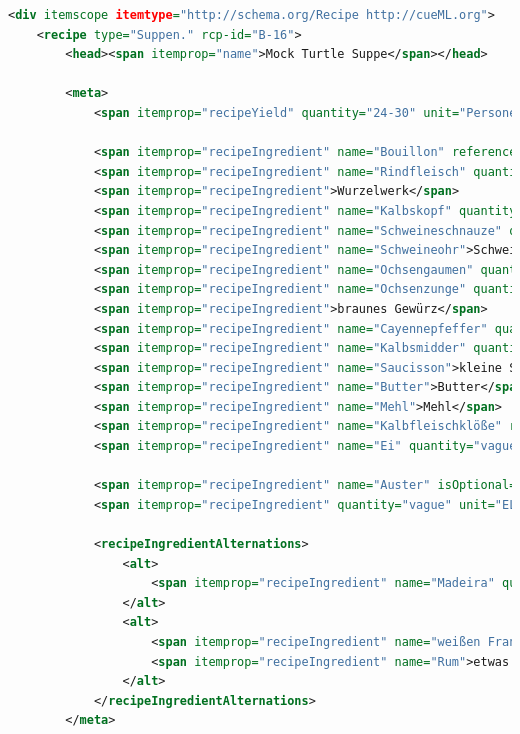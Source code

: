 \documentclass[12pt, twoside]{report}
\begin{document}
\begin{lstlisting}[language=XML, caption={Enriched with cueML}]
<div itemscope itemtype="http://schema.org/Recipe http://cueML.org">
	<recipe type="Suppen." rcp-id="B-16">
		<head><span itemprop="name">Mock Turtle Suppe</span></head>
		
		<meta>
			<span itemprop="recipeYield" quantity="24-30" unit="Personen">24-30 Personen</span>
			
			<span itemprop="recipeIngredient" name="Bouillon" reference="#Bouillon">Bouillon</span>
			<span itemprop="recipeIngredient" name="Rindfleisch" quantity="8-10" unit="Pfund">8-10 Pfund Rindfleisch</span>
			<span itemprop="recipeIngredient">Wurzelwerk</span>
			<span itemprop="recipeIngredient" name="Kalbskopf" quantity="1">1 Kalbskopf</span>
			<span itemprop="recipeIngredient" name="Schweineschnauze" quantity="1">1 Schweineschnauze</span>
			<span itemprop="recipeIngredient" name="Schweineohr">Schweineohren</span>
			<span itemprop="recipeIngredient" name="Ochsengaumen" quantity="1">1 Ochsengaumen</span>
			<span itemprop="recipeIngredient" name="Ochsenzunge" quantity="1">1 geräucherte Ochsenzunge</span>
			<span itemprop="recipeIngredient">braunes Gewürz</span>
			<span itemprop="recipeIngredient" name="Cayennepfeffer" quantity="vague" unit="Messersptize">ein Paar Messerspitzen Cayenne-Pfeffer</span>
			<span itemprop="recipeIngredient" name="Kalbsmidder" quantity="vague" reference="#A-16">einige Kalbsmidder</span>
			<span itemprop="recipeIngredient" name="Saucisson">kleine Saucissen</span>
			<span itemprop="recipeIngredient" name="Butter">Butter</span>
			<span itemprop="recipeIngredient" name="Mehl">Mehl</span>
			<span itemprop="recipeIngredient" name="Kalbfleischklöße" reference="#L-4">Klöße vom Kalbfleisch</span>
			<span itemprop="recipeIngredient" name="Ei" quantity="vague">einige hart gekochte Eier</span>
			
			<span itemprop="recipeIngredient" name="Auster" isOptional="True">Austern, wenn man sie haben kann</span>
			<span itemprop="recipeIngredient" quantity="vague" unit="EL" isOptional="True">ein Paar Eßlöffel Engl. Soja</span>
			
			<recipeIngredientAlternations>
				<alt>
					<span itemprop="recipeIngredient" name="Madeira" quantity="0.5" unit="Flasche">Madeira</span>
				</alt>
				<alt>
					<span itemprop="recipeIngredient" name="weißen Franzwein">weißen Franzwein</span>
					<span itemprop="recipeIngredient" name="Rum">etwas Rum</span>
				</alt>
			</recipeIngredientAlternations>
		</meta>


\end{lstlisting}
\end{document}
